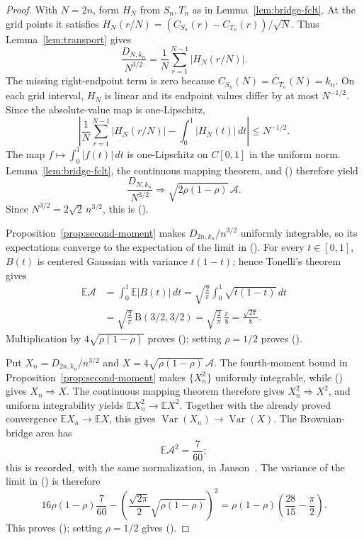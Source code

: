 \documentclass[twoside,10pt]{article}
\numberwithin{equation}{section}
\theoremstyle{slbody}
\theoremstyle{definition}
\theoremstyle{remark}
\newcommand{\E}{\mathbb{E}}
\newcommand{\Var}{\operatorname{Var}}
\newcommand{\1}{\mathbf{1}}
\renewcommand{\eqref}[1]{%
  \textup{{\normalfont(\oldstylenums{\ref{#1}}}\normalfont)}}
\begin{document}
\begin{proof}
With $N=2n$, form $H_N$ from $S_n,T_n$ as in
Lemma~\ref{lem:bridge-fclt}.  At the grid points it satisfies
$H_N(r/N)=(C_{S_n}(r)-C_{T_n}(r))/\sqrt N$.  Thus
Lemma~\ref{lem:transport} gives
\begin{equation}\label{eq:riemann-area}
 \frac{D_{N,k_n}}{N^{3/2}}
 =\frac1N\sum_{r=1}^{N-1}|H_N(r/N)|.
\end{equation}
The missing right-endpoint term is zero because
$C_{S_n}(N)=C_{T_n}(N)=k_n$.  On each grid interval, $H_N$ is linear and its
endpoint values differ by at most $N^{-1/2}$.  Since the absolute-value map is
one-Lipschitz,
\begin{equation}\label{eq:riemann-error}
 \left|
 \frac1N\sum_{r=1}^{N-1}|H_N(r/N)|
 -\int_0^1|H_N(t)|\,dt
 \right|\leq N^{-1/2}.
\end{equation}
The map $f\mapsto\int_0^1|f(t)|\,dt$ is one-Lipschitz on $C[0,1]$ in the
uniform norm.  Lemma~\ref{lem:bridge-fclt}, the continuous mapping theorem,
and \eqref{eq:riemann-error} therefore yield
\[
 \frac{D_{N,k_n}}{N^{3/2}}
 \Rightarrow\sqrt{2\rho(1-\rho)}\,\mathcal A.
\]
Since $N^{3/2}=2\sqrt2\,n^{3/2}$, this is
\eqref{eq:distribution-main}.

Proposition~\ref{prop:second-moment} makes
$D_{2n,k_n}/n^{3/2}$ uniformly integrable, so its expectations converge to
the expectation of the limit in \eqref{eq:distribution-main}.  For every
$t\in[0,1]$, $B(t)$ is centered Gaussian with variance $t(1-t)$; hence
Tonelli's theorem gives
\begin{align*}
 \E\mathcal A
 &=\int_0^1\E|B(t)|\,dt
 =\sqrt{\frac2\pi}\int_0^1\sqrt{t(1-t)}\,dt \\
 &=\sqrt{\frac2\pi}\,\mathrm B(3/2,3/2)
 =\sqrt{\frac2\pi}\,\frac\pi8
 =\frac{\sqrt{2\pi}}8.
\end{align*}
Multiplication by $4\sqrt{\rho(1-\rho)}$ proves
\eqref{eq:expectation-main}; setting $\rho=1/2$ proves
\eqref{eq:central-main}.

Put $X_n=D_{2n,k_n}/n^{3/2}$ and
$X=4\sqrt{\rho(1-\rho)}\,\mathcal A$.  The fourth-moment bound in
Proposition~\ref{prop:second-moment} makes $\{X_n^2\}$ uniformly integrable,
while \eqref{eq:distribution-main} gives $X_n\Rightarrow X$.  The continuous
mapping theorem therefore gives $X_n^2\Rightarrow X^2$, and uniform
integrability yields $\E X_n^2\to\E X^2$.  Together with the already proved
convergence $\E X_n\to\E X$, this gives $\Var(X_n)\to\Var(X)$.  The
Brownian-bridge area has
\begin{equation}\label{eq:brownian-area-second-moment}
 \E\mathcal A^2=\frac7{60};
\end{equation}
this is recorded, with the same normalization, in
Janson~\cite[Section~20, Eq.~(135) and Table~2, p.~107]{Janson}.  The variance of the limit in
\eqref{eq:distribution-main} is therefore
\[
 16\rho(1-\rho)\frac7{60}
 -\left(\frac{\sqrt{2\pi}}2\sqrt{\rho(1-\rho)}\right)^2
 =\rho(1-\rho)\left(\frac{28}{15}-\frac\pi2\right).
\]
This proves \eqref{eq:variance-main}; setting $\rho=1/2$ gives
\eqref{eq:central-variance}.
\end{proof}
\end{document}
